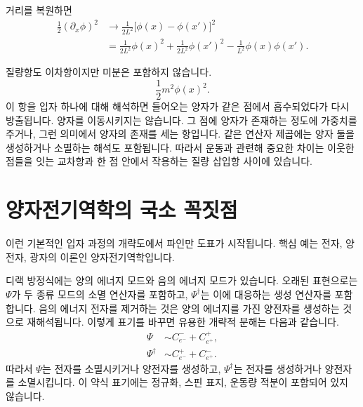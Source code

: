 \begin{classroomqa}
\end{classroomqa}

거리를 복원하면
\begin{align}
\frac12(\partial_x\phi)^2
&\longrightarrow
\frac{1}{2L^2}\bigl[\phi(x)-\phi(x')\bigr]^2
\\
&=
\frac{1}{2L^2}\phi(x)^2
+\frac{1}{2L^2}\phi(x')^2
-\frac{1}{L^2}\phi(x)\phi(x').
\end{align}

질량항도 이차항이지만 미분은 포함하지 않습니다.
\begin{equation}
\frac12m^2\phi(x)^2.
\end{equation}
이 항을 입자 하나에 대해 해석하면 들어오는 양자가 같은 점에서 흡수되었다가 다시 방출됩니다. 양자를 이동시키지는 않습니다. 그 점에 양자가 존재하는 정도에 가중치를 주거나, 그런 의미에서 양자의 존재를 세는 항입니다. 같은 연산자 제곱에는 양자 둘을 생성하거나 소멸하는 해석도 포함됩니다. 따라서 운동과 관련해 중요한 차이는 이웃한 점들을 잇는 교차항과 한 점 안에서 작용하는 질량 삽입항 사이에 있습니다.

\section{양자전기역학의 국소 꼭짓점}

이런 기본적인 입자 과정의 개략도에서 파인만 도표가 시작됩니다. 핵심 예는 전자, 양전자, 광자의 이론인 양자전기역학입니다.

디랙 방정식에는 양의 에너지 모드와 음의 에너지 모드가 있습니다. 오래된 표현으로는 \(\Psi\)가 두 종류 모드의 소멸 연산자를 포함하고, \(\Psi^\dagger\)는 이에 대응하는 생성 연산자를 포함합니다. 음의 에너지 전자를 제거하는 것은 양의 에너지를 가진 양전자를 생성하는 것으로 재해석됩니다. 이렇게 표기를 바꾸면 유용한 개략적 분해는 다음과 같습니다.
\begin{align}
\Psi
&\sim
C^-_{e^-}+C^+_{e^+},
\\
\Psi^\dagger
&\sim
C^+_{e^-}+C^-_{e^+}.
\end{align}
따라서 \(\Psi\)는 전자를 소멸시키거나 양전자를 생성하고, \(\Psi^\dagger\)는 전자를 생성하거나 양전자를 소멸시킵니다. 이 약식 표기에는 정규화, 스핀 표지, 운동량 적분이 포함되어 있지 않습니다.

